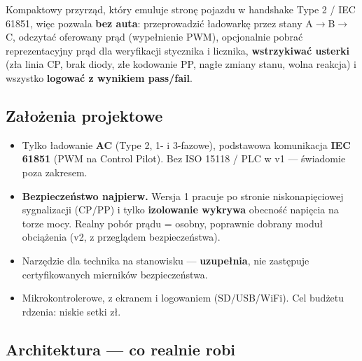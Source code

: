 \documentclass[11pt]{article}
\newcommand{\ra}{$\rightarrow$}
\begin{document}
Kompaktowy przyrząd, który emuluje stronę pojazdu w handshake Type 2 / IEC 61851, więc pozwala \textbf{bez auta}: przeprowadzić ładowarkę przez stany A\ra{}B\ra{}C, odczytać oferowany prąd (wypełnienie PWM), opcjonalnie pobrać reprezentacyjny prąd dla weryfikacji stycznika i licznika, \textbf{wstrzykiwać usterki} (zła linia CP, brak diody, złe kodowanie PP, nagłe zmiany stanu, wolna reakcja) i wszystko \textbf{logować z wynikiem pass/fail}.

\subsection{Założenia projektowe}

\begin{itemize}
  \item Tylko ładowanie \textbf{AC} (Type 2, 1- i 3-fazowe), podstawowa komunikacja \textbf{IEC 61851} (PWM na Control Pilot). Bez ISO 15118 / PLC w v1 --- świadomie poza zakresem.
  \item \textbf{Bezpieczeństwo najpierw.} Wersja 1 pracuje po stronie niskonapięciowej sygnalizacji (CP/PP) i tylko \textbf{izolowanie wykrywa} obecność napięcia na torze mocy. Realny pobór prądu = osobny, poprawnie dobrany moduł obciążenia (v2, z przeglądem bezpieczeństwa).
  \item Narzędzie dla technika na stanowisku --- \textbf{uzupełnia}, nie zastępuje certyfikowanych mierników bezpieczeństwa.
  \item Mikrokontrolerowe, z ekranem i logowaniem (SD/USB/WiFi). Cel budżetu rdzenia: niskie setki zł.
\end{itemize}

\subsection{Architektura --- co realnie robi}
\end{document}
